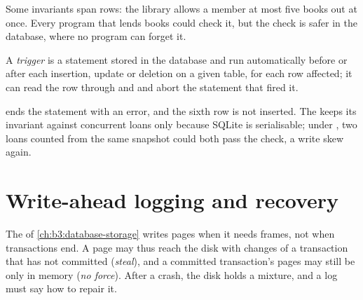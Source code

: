 Some invariants span rows: the library allows a member at most five books out at once. Every program that lends books could check it, but the check is safer in the database, where no program can forget it.

\begin{definition}[Trigger]\label{def:b3:transactions-and-recovery:trigger}
A \emph{trigger} is a statement stored in the database and run automatically before or after each insertion, update or deletion on a given table, for each row affected; it can read the row through  and  and abort the statement that fired it.
\end{definition}

\label{lst:b3:transactions-and-recovery:trigger}

\label{out:b3:transactions-and-recovery:trigger}

 ends the statement with an error, and the sixth row is not inserted. %
The  keeps its invariant against concurrent loans only because SQLite is serialisable; under , two loans counted from the same snapshot could both pass the check, a write skew again.

\section{Write-ahead logging and recovery}\label{sec:b3:transactions-and-recovery:recovery}

The  of \cref{ch:b3:database-storage} writes pages when it needs frames, not when transactions end. A page may thus reach the disk with changes of a transaction that has not committed (\emph{steal}), and a committed transaction's pages may still be only in memory (\emph{no force}). After a crash, the disk holds a mixture, and a log must say how to repair it.

